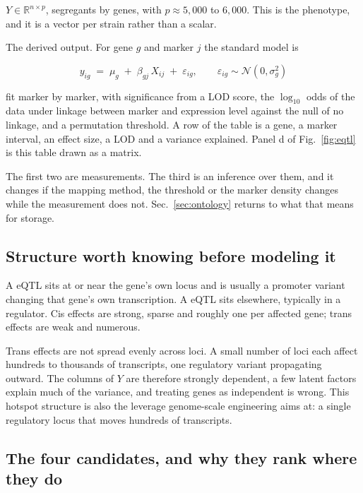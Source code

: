  $Y \in \mathbb{R}^{n \times p}$, segregants by genes, with
$p \approx 5{,}000$ to $6{,}000$. This is the phenotype, and it is a vector per strain
rather than a scalar.

 The derived output. For gene $g$ and marker $j$ the standard model is

$$
y_{ig} \;=\; \mu_g \;+\; \beta_{gj}\,X_{ij} \;+\; \varepsilon_{ig},
\qquad \varepsilon_{ig} \sim \mathcal{N}(0,\sigma_g^2)
$$

fit marker by marker, with significance from a LOD score, the $\log_{10}$ odds of the
data under linkage between marker and expression level against the null of no linkage,
and a permutation threshold. A row of the table is a gene, a marker interval, an effect
size, a LOD and a variance explained. Panel d of Fig.~\ref{fig:eqtl} is this table drawn
as a matrix.

The first two are measurements. The third is an inference over them, and it changes if the
mapping method, the threshold or the marker density changes while the measurement does not.
Sec.~\ref{sec:ontology} returns to what that means for storage.

\subsection{Structure worth knowing before modeling it}

 A  eQTL sits at or near the gene's own locus and is
usually a promoter variant changing that gene's own transcription. A  eQTL sits
elsewhere, typically in a regulator. Cis effects are strong, sparse and roughly one per
affected gene; trans effects are weak and numerous.

 Trans effects are not spread evenly across loci. A small number of loci
each affect hundreds to thousands of transcripts, one regulatory variant propagating
outward. The columns of $Y$ are therefore strongly dependent, a few latent factors explain
much of the variance, and treating genes as independent is wrong. This hotspot structure
is also the leverage genome-scale engineering aims at: a single regulatory locus that
moves hundreds of transcripts.

\subsection{The four candidates, and why they rank where they do}

